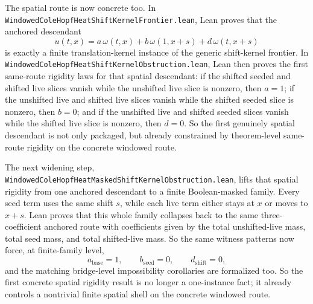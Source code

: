 \documentclass[11pt]{article}
\theoremstyle{remark}
\begin{document}
The spatial route is now concrete too.  In
\texttt{WindowedColeHopfHeatShiftKernelFrontier.lean}, Lean proves that the
anchored descendant
\[
  u(t,x)=a\,\omega(t,x)+b\,\omega(1,x+s)+d\,\omega(t,x+s)
\]
is exactly a finite translation-kernel instance of the generic shift-kernel
frontier.  In
\texttt{WindowedColeHopfHeatShiftKernelObstruction.lean}, Lean then proves the
first same-route rigidity laws for that spatial descendant: if the shifted
seeded and shifted live slices vanish while the unshifted live slice is
nonzero, then \(a=1\); if the unshifted live and shifted live slices vanish
while the shifted seeded slice is nonzero, then \(b=0\); and if the unshifted
live and shifted seeded slices vanish while the shifted live slice is nonzero,
then \(d=0\).  So the first genuinely spatial descendant is not only packaged,
but already constrained by theorem-level same-route rigidity on the concrete
windowed route.

The next widening step,
\texttt{WindowedColeHopfHeatMaskedShiftKernelObstruction.lean}, lifts that
spatial rigidity from one anchored descendant to a finite Boolean-masked family.
Every seed term uses the same shift \(s\), while each live term either stays at
\(x\) or moves to \(x+s\).  Lean proves that this whole family collapses back to
the same three-coefficient anchored route with coefficients given by the total
unshifted-live mass, total seed mass, and total shifted-live mass.  So the same
witness patterns now force, at finite-family level,
\[
  a_{\mathrm{base}}=1,\qquad b_{\mathrm{seed}}=0,\qquad
  d_{\mathrm{shift}}=0,
\]
and the matching bridge-level impossibility corollaries are formalized too.  So
the first concrete spatial rigidity result is no longer a one-instance fact; it
already controls a nontrivial finite spatial shell on the concrete windowed
route.
\end{document}
